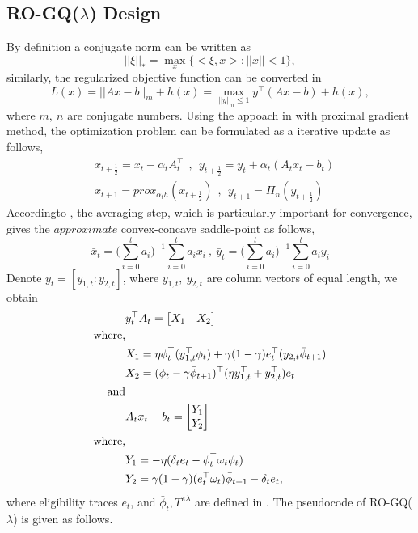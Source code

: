 \documentclass[conference]{IEEEtran}
\begin{document}
\subsection{RO-GQ($\lambda$) Design}
By definition a conjugate norm can be written as \cite{sra2012optimization}
\begin{equation}
	||\xi||_* = \max_{x}\big\{\big<\xi, x\big>:||x||<1\big\},
\end{equation}
similarly, the regularized objective function can be converted in
\begin{equation}
	L(x)=||Ax-b||_m+h(x)= \max_{||y||_n\leq 1} y^\top(Ax-b)+h(x),
\end{equation}
where $m,\ n$ are conjugate numbers. Using the appoach in \cite{nemirovski2009robust} with proximal gradient method, the optimization problem can be formulated as a iterative update as follows,
\begin{equation}
\begin{split}
	&x_{t+\frac{1}{2}}=x_t-\alpha_tA_t^\top\ \ ,\ \ y_{t+\frac{1}{2}}=y_t+\alpha_t(A_tx_t-b_t)\\
	&x_{t+1}=prox_{\alpha_th}(x_{t+\frac{1}{2}})\ \ ,\ \ y_{t+1}=\Pi_n(y_{t+\frac{1}{2}})
\end{split}
\end{equation}
Accordingto \cite{sra2012optimization}\cite{nedic2009subgradient}, the averaging step, which is particularly important for convergence, gives the $approximate $ convex-concave saddle-point as follows,
\begin{equation}
	\bar{x}_t = \bigg(\sum_{i=0}^{t}a_i\bigg)^{-1}\sum_{i=0}^ta_ix_i\ ,\ \bar{y}_t=\bigg(\sum_{i=0}^{t}a_i\bigg)^{-1}\sum_{i=0}^ta_iy_i
\end{equation}
Denote $y_t=[y_{1, t}:y_{2, t}]$, where $y_{1, t},\ y_{2, t}$ are column vectors of equal length, we obtain
\begin{equation}
\begin{split}
	&y_t^\top A_t = \begin{bmatrix}
						X_1 & X_2
					\end{bmatrix}\\
	\textup{where,}\\
	&X_1 = \eta\phi_t^\top(y_{1, t}^\top\phi_t)+\gamma(1-\gamma)e_t^\top(y_{2, t}\bar{\phi}_{t+1})\\
	&X_2 = (\phi_t-\gamma\bar{\phi}_{t+1})^\top(\eta y_{1, t}^\top+y_{2, t}^\top)e_t\\
	\textup{and}\\
	&A_tx_t - b_t = \begin{bmatrix}
	 					Y_1 \\
	 					Y_2
	 				\end{bmatrix}\\
	\textup{where,}\\
	&Y_1=-\eta(\delta_t e_t - \phi_t^\top\omega_t\phi_t)\\
	&Y_2=\gamma(1-\gamma)(e_t^\top\omega_t)\bar{\phi}_{t+1} - \delta_t e_t,
\end{split}
\end{equation}
where eligibility traces $e_t$, and $\bar{\phi}_t,T^{\pi\lambda}$ are defined in \cite{maei2010gq}. The pseudocode of RO-GQ($\lambda$) is given as follows.\\ 
\end{document}
